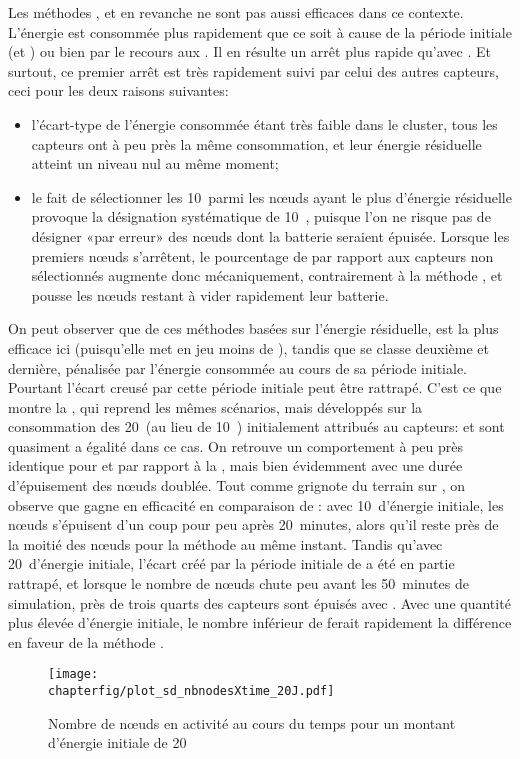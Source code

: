 Les méthodes \ideres, \iddemx et \iddems en revanche ne sont pas aussi efficaces dans ce contexte.
L'énergie est consommée plus rapidement que ce soit à cause de la période initiale (\iddemx et \iddems) ou bien par le recours aux \vns.
Il en résulte un arrêt plus rapide qu'avec \idrand.
Et surtout, ce premier arrêt est très rapidement suivi par celui des autres capteurs, ceci pour les deux raisons suivantes:
\begin{itemize}
    \item l'écart-type de l'énergie consommée étant très faible dans le cluster, tous les capteurs ont à peu près la même consommation, et leur énergie résiduelle atteint un niveau nul au même moment;
    \item le fait de sélectionner les 10~\cns parmi les nœuds ayant le plus d'énergie résiduelle provoque la désignation systématique de 10~\cns, puisque l'on ne risque pas de désigner «par erreur» des nœuds dont la batterie seraient épuisée. Lorsque les premiers nœuds s'arrêtent, le pourcentage de \cns par rapport aux capteurs non sélectionnés augmente donc mécaniquement, contrairement à la méthode \idrand, et pousse les nœuds restant à vider rapidement leur batterie.
\end{itemize}

On peut observer que de ces méthodes basées sur l'énergie résiduelle, \iddems est la plus efficace ici (puisqu'elle met en jeu moins de \cns), tandis que \ideres se classe deuxième et \iddemx dernière, pénalisée par l'énergie consommée au cours de sa période initiale.
Pourtant l'écart creusé par cette période initiale peut être rattrapé.
C'est ce que montre la , qui reprend les mêmes scénarios, mais développés sur la consommation des 20~\joule (au lieu de 10~\joule) initialement attribués au capteurs: \iddemx et \ideres sont quasiment a égalité dans ce cas.
On retrouve un comportement à peu près identique pour \idstat et \idrand par rapport à la , mais bien évidemment avec une durée d'épuisement des nœuds doublée.
Tout comme \iddemx grignote du terrain sur \ideres, on observe que \iddems gagne en efficacité en comparaison de \idrand: avec 10~\joule d'énergie initiale, les nœuds s'épuisent d'un coup pour \iddems peu après 20~minutes, alors qu'il reste près de la moitié des nœuds pour la méthode \idrand au même instant.
Tandis qu'avec 20~\joule d'énergie initiale, l'écart créé par la période initiale de \iddems a été en partie rattrapé, et lorsque le nombre de nœuds chute peu avant les 50~minutes de simulation, près de trois quarts des capteurs sont épuisés avec \idrand.
Avec une quantité plus élevée d'énergie initiale, le nombre inférieur de \cns ferait rapidement la différence en faveur de la méthode \iddems.
\begin{figure}[!ht]
    \centering
    \texttt{[image: \\chapterfig/plot\_sd\_nbnodesXtime\_20J.pdf]}
    \caption{Nombre de nœuds en activité au cours du temps pour un montant d'énergie initiale de 20~\joule}\label{sd:fig:nbnodes-20J}
\end{figure}

